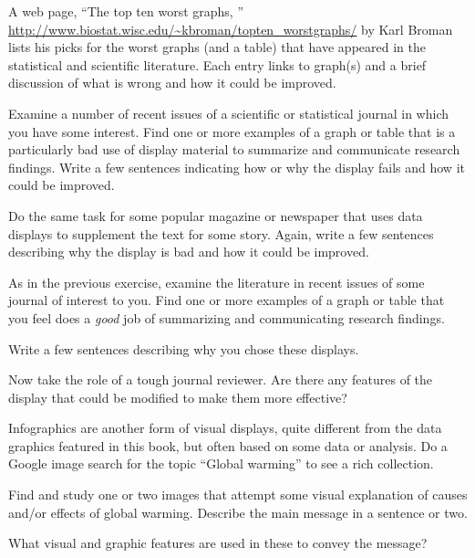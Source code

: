 
\begin{Exercises}

 \exercise A web page, ``The top ten worst graphs, '' \url{http://www.biostat.wisc.edu/~kbroman/topten_worstgraphs/} by Karl Broman lists his picks for the worst graphs (and a table) that have appeared in the
 statistical and scientific literature.  Each entry links to graph(s) and a brief discussion of
 what is wrong and how it could be improved. 
 \begin{enumerate*}
   \item Examine a number of recent issues of a scientific or statistical journal in which you
   have some interest.  Find one or more examples of a graph or table that is a particularly
   bad use of display material to summarize and communicate research findings. Write a
   few sentences indicating how or why the display fails and how it could be improved.
   \item Do the same task for some popular magazine or newspaper that uses data displays
   to supplement the text for some story. Again, write a few sentences describing why the
   display is bad and how it could be improved.
 \end{enumerate*}
 
 \exercise As in the previous exercise, examine the literature in recent issues of some
 journal of interest to you.  Find one or more examples of a graph or table that you feel
 does a \emph{good} job of summarizing and communicating research findings.
 \begin{enumerate*}
   \item Write a few sentences describing why you chose these displays.
   \item Now take the role of a tough journal reviewer.  Are there any features of the
   display that could be modified to make them more effective?
 \end{enumerate*}
 
 \exercise Infographics are another form of visual displays, quite different from the
 data graphics featured in this book, but often based on some data or analysis.
 Do a Google image search for the topic ``Global warming'' to see a rich
 collection.
 \begin{enumerate*}
   \item Find and study one or two images that attempt some visual explanation of causes
   and/or effects of global warming.  Describe the main message in a sentence or
   two.
   \item What visual and graphic features are used in these to convey the message?
 \end{enumerate*}


\end{Exercises}
